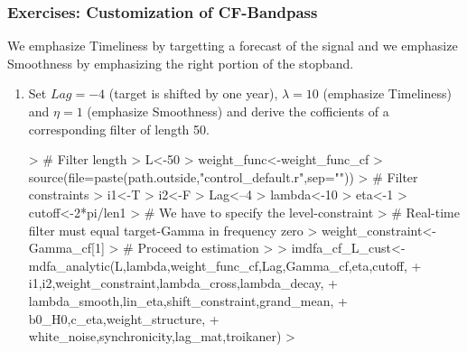 \documentclass[a4paper]{book}
\begin{document}
\subsubsection{Exercises: Customization of CF-Bandpass}

We emphasize Timeliness by targetting a forecast of the signal and we emphasize Smoothness by emphasizing the right portion of the stopband.
\begin{enumerate}
\item Set $Lag=-4$ (target is shifted by one year), $\lambda=10$ (emphasize Timeliness) and $\eta=1$ (emphasize Smoothness) and derive the cofficients of a corresponding filter of length 50.
\begin{Schunk}
\begin{Sinput}
> # Filter length
> L<-50
> weight_func<-weight_func_cf  
> source(file=paste(path.outside,"control_default.r",sep=""))
> # Filter constraints
> i1<-T
> i2<-F
> Lag<--4
> lambda<-10
> eta<-1
> cutoff<-2*pi/len1
> # We have to specify the level-constraint
> #   Real-time filter must equal target-Gamma in frequency zero
> weight_constraint<-Gamma_cf[1]
> # Proceed to estimation
> 
> imdfa_cf_L_cust<-mdfa_analytic(L,lambda,weight_func_cf,Lag,Gamma_cf,eta,cutoff,
+                         i1,i2,weight_constraint,lambda_cross,lambda_decay,
+                         lambda_smooth,lin_eta,shift_constraint,grand_mean,
+                         b0_H0,c_eta,weight_structure,
+                         white_noise,synchronicity,lag_mat,troikaner)
> 
\end{Sinput}
\end{Schunk}

\end{enumerate}
\end{document}
